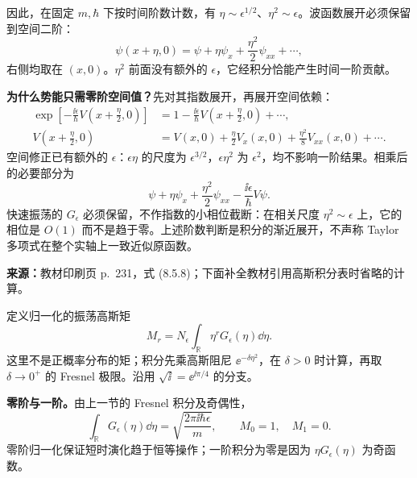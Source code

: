 因此，在固定 $m,\hbar$ 下按时间阶数计数，有 $\eta\sim\epsilon^{1/2}$、$\eta^2\sim\epsilon$。波函数展开必须保留到空间二阶：
\begin{equation}
  \psi(x+\eta,0)=\psi+\eta\psi_x
    +\frac{\eta^2}{2}\psi_{xx}+\cdots,
  \label{eq:QM-C08-S05-psi-taylor}
\end{equation}
右侧均取在 $(x,0)$。$\eta^2$ 前面没有额外的 $\epsilon$，它经积分恰能产生时间一阶贡献。

\textbf{为什么势能只需零阶空间值？}先对其指数展开，再展开空间依赖：
\begin{align}
  \exp\!\left[-\frac{\ii\epsilon}{\hbar}V\left(x+\frac\eta2,0\right)\right]
    &=1-\frac{\ii\epsilon}{\hbar}V\left(x+\frac\eta2,0\right)+\cdots,\\
  V\left(x+\frac\eta2,0\right)
    &=V(x,0)+\frac\eta2V_x(x,0)+\frac{\eta^2}{8}V_{xx}(x,0)+\cdots.
\end{align}
空间修正已有额外的 $\epsilon$：$\epsilon\eta$ 的尺度为 $\epsilon^{3/2}$，$\epsilon\eta^2$ 为 $\epsilon^2$，均不影响一阶结果。相乘后的必要部分为
\begin{equation}
  \boxed{\psi+\eta\psi_x+\frac{\eta^2}{2}\psi_{xx}
    -\frac{\ii\epsilon}{\hbar}V\psi}.
  \label{eq:QM-C08-S05-retained}
\end{equation}
快速振荡的 $G_\epsilon$ 必须保留，不作指数的小相位截断：在相关尺度 $\eta^2\sim\epsilon$ 上，它的相位是 $O(1)$ 而不是趋于零。上述阶数判断是积分的渐近展开，不声称 Taylor 多项式在整个实轴上一致近似原函数。

\textbf{来源：}教材印刷页 p.~231，式 (8.5.8)；下面补全教材引用高斯积分表时省略的计算。

定义归一化的振荡高斯矩
\begin{equation}
  M_r=N_\epsilon\int_{\mathbb R}\eta^rG_\epsilon(\eta)\dd\eta.
\end{equation}
这里不是正概率分布的矩；积分先乘高斯阻尼 $\ee^{-\delta\eta^2}$，在 $\delta>0$ 时计算，再取 $\delta\to0^+$ 的 Fresnel 极限。沿用 $\sqrt{\ii}=\ee^{\ii\pi/4}$ 的分支。

\textbf{零阶与一阶。}由上一节的 Fresnel 积分及奇偶性，
\begin{equation}
  \int_{\mathbb R}G_\epsilon(\eta)\dd\eta
    =\sqrt{\frac{2\pi\ii\hbar\epsilon}{m}},
  \qquad \boxed{M_0=1,\quad M_1=0}.
\end{equation}
零阶归一化保证短时演化趋于恒等操作；一阶积分为零是因为 $\eta G_\epsilon(\eta)$ 为奇函数。


